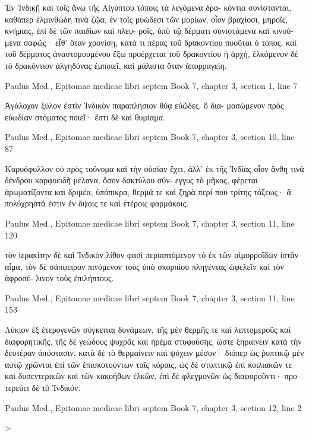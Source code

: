 \documentclass[12pt,letterpaper,twoside,final]{memoir}
\begin{document}
\begin{greek}
 Ἐν Ἰνδικῇ καὶ τοῖς ἄνω τῆς Αἰγύπτου τόποις τὰ λεγόμενα δρα-
κόντια συνίστανται, καθάπερ ἑλμινθώδη τινὰ ζῷα, ἐν τοῖς μυώδεσι τῶν   
μορίων, οἷον βραχίοσι, μηροῖς, κνήμαις, ἐπὶ δὲ τῶν παιδίων καὶ πλευ-
ροῖς, ὑπὸ τῷ δέρματι συνιστάμενα καὶ κινούμενα σαφῶς· εἶθ' ὅταν 
χρονίσῃ, κατά τι πέρας τοῦ δρακοντίου πυοῦται ὁ τόπος, καὶ τοῦ 
δέρματος ἀναστομουμένου ἔξω προέρχεται τοῦ δρακοντίου ἡ ἀρχή, 
ἑλκόμενον δὲ τὸ δρακόντιον ἀλγηδόνας ἐμποιεῖ, καὶ μάλιστα ὅταν 
ἀπορραγείη. 



Paulus Med., Epitomae medicae libri septem 
Book 7, chapter 3, section 1, line 7

Ἀγάλοχον ξύλον ἐστὶν Ἰνδικὸν παραπλήσιον θύᾳ εὐῶδες, ὃ δια-
μασώμενον πρὸς εὐωδίαν στόματος ποιεῖ· ἔστι δὲ καὶ θυμίαμα. 



Paulus Med., Epitomae medicae libri septem 
Book 7, chapter 3, section 10, line 87

Καρυόφυλλον οὐ πρὸς τοὔνομα καὶ τὴν οὐσίαν ἔχει, ἀλλ' ἐκ τῆς 
Ἰνδίας οἷον ἄνθη τινὰ δένδρου καρφοειδῆ μέλανα, ὅσον δακτύλου σύν-
εγγυς τὸ μῆκος, φέρεται ἀρωματίζοντα καὶ δριμέα, ὑπόπικρα, θερμά 
τε καὶ ξηρὰ περί που τρίτης τάξεως· ἃ πολύχρηστά ἐστιν ἐν ὄψοις 
τε καὶ ἑτέροις φαρμάκοις. 



Paulus Med., Epitomae medicae libri septem 
Book 7, chapter 3, section 11, line 120

                                 τὸν ἱερακίτην δὲ καὶ Ἰνδικὸν λίθον φασὶ 
περιαπτόμενον τὸ ἐκ τῶν αἱμορροΐδων ἱστᾶν αἷμα, τὸν δὲ σάπφειρον 
πινόμενον τοὺς ὑπὸ σκορπίου πληγέντας ὠφελεῖν καὶ τὸν ἀφροσέ-
λινον τοὺς ἐπιλήπτους. 



Paulus Med., Epitomae medicae libri septem 
Book 7, chapter 3, section 11, line 153

Λύκιον ἐξ ἑτερογενῶν σύγκειται δυνάμεων, τῆς μὲν θερμῆς τε 
καὶ λεπτομεροῦς καὶ διαφορητικῆς, τῆς δὲ γεώδους ψυχρᾶς καὶ ἠρέμα 
στυφούσης, ὥστε ξηραίνειν κατὰ τὴν δευτέραν ἀπόστασιν, κατὰ δὲ τὸ 
θερμαίνειν καὶ ψύχειν μέσον· διόπερ ὡς ῥυπτικῷ μὲν αὐτῷ χρῶνται 
ἐπὶ τῶν ἐπισκοτούντων ταῖς κόραις, ὡς δὲ στυπτικῷ ἐπὶ κοιλιακῶν τε 
καὶ δυσεντερικῶν καὶ τῶν κακοήθων ἑλκῶν, ἐπὶ δὲ φλεγμονῶν ὡς 
διαφοροῦντι· προτερεύει δὲ τὸ Ἰνδικόν. 



Paulus Med., Epitomae medicae libri septem 
Book 7, chapter 3, section 12, line 2

                            >



\end{greek}
\end{document}
